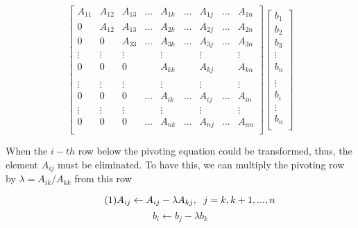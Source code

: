 \documentclass[a4paper]{article}
\numberwithin{equation}{subsection}
\begin{document}
\vspace{5mm} %
\begin{equation} \tag{M1}
\begin{bmatrix}
A_{11} & A_{12} & A_{13} & \dots & A_{1k} & \dots & A_{1j} & \dots & A_{1n} \\
0 & A_{12} & A_{13} & \dots & A_{2k} & \dots & A_{2j} & \dots & A_{2n}  \\
0 & 0 & A_{33} & \dots & A_{3k} & \dots & A_{3j} & \dots & A_{3n} \\
\vdots & \vdots & \vdots &  & \vdots & & \vdots & & \vdots  \\
0 & 0 & 0 & & A_{kk} & & A_{kj} & & A_{kn} \\
\\ \hline
\vdots & \vdots & \vdots &  & \vdots &  & \vdots &  & \vdots  \\
0 & 0 & 0 & \dots  & A_{ik} &  \dots & A_{ij} & \dots & A_{in}  \\
\vdots & \vdots & \vdots &  &\vdots &   &  \vdots & & \vdots  \\
0 & 0 & 0 & \dots  & A_{nk} & \dots  & A_{nj} &  \dots & A_{nn}  \\
\end{bmatrix}
\begin{bmatrix}
b_1 \\
b_2 \\
b_3 \\
\vdots \\
b_n \\
\\ \hline
\vdots \\
b_i \\
\vdots \\
b_n \\
\end{bmatrix}
\end{equation}



\vspace{5mm} %
When the $i-th$ row below the pivoting equation could be transformed, thus, the element $A_{ij}$  must be eliminated. To have this, we can multiply the pivoting row by $\lambda = A_{ik} / A_{kk}$ from this row


\vspace{5mm} %
\begin{equation} \tag{1} \label{eq:1}
A_{ij} \leftarrow A_{ij} - \lambda A_{kj}, \hspace{2mm} j=k,k+1,...,n
\end{equation}
\begin{equation} \tag{1.1}
b_i \leftarrow b_j-\lambda b_k 
\end{equation}
\end{document}
